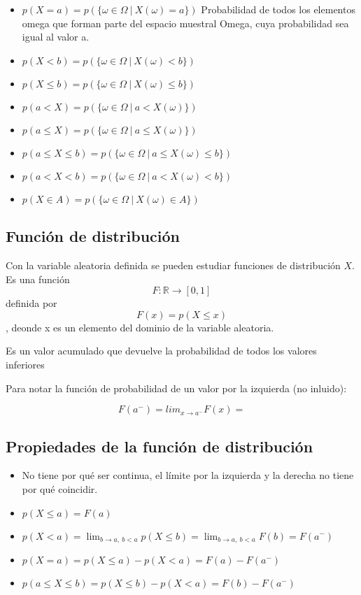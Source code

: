\documentclass[
]{article}
\providecommand{\tightlist}{%
  \setlength{\itemsep}{0pt}\setlength{\parskip}{0pt}}
\begin{document}
\begin{itemize}
\tightlist
\item
  \(p(X=a) = p(\{\omega\in\Omega \ |\  X(\omega) = a\})\) Probabilidad
  de todos los elementos omega que forman parte del espacio muestral
  Omega, cuya probabilidad sea igual al valor a.
\item
  \(p(X<b) = p(\{\omega\in\Omega \ |\  X(\omega) < b\})\)
\item
  \(p(X\le b) = p(\{\omega\in\Omega \ |\  X(\omega) \le b\})\)
\item
  \(p(a<X) = p(\{\omega\in\Omega \ |\  a<X(\omega)\})\)
\item
  \(p(a\le X) = p(\{\omega\in\Omega \ |\  a\le X(\omega)\})\)
\item
  \(p(a\le X\le b) = p(\{\omega\in\Omega \ |\  a\le X(\omega) \le b\})\)
\item
  \(p(a< X< b) = p(\{\omega\in\Omega \ |\  a< X(\omega) < b\})\)
\item
  \(p(X\in A) = p(\{\omega\in\Omega \ |\  X(\omega)\in A\})\)
\end{itemize}

\hypertarget{funciuxf3n-de-distribuciuxf3n}{%
\subsection{Función de
distribución}\label{funciuxf3n-de-distribuciuxf3n}}

Con la variable aleatoria definida se pueden estudiar funciones de
distribución \(X\). Es una función\\
\[F:\mathbb{R}\longrightarrow [0,1]\] definida por \[F(x)=p(X\le x)\],
deonde x es un elemento del dominio de la variable aleatoria.

Es un valor acumulado que devuelve la probabilidad de todos los valores
inferiores

Para notar la función de probabilidad de un valor por la izquierda (no
inluido):

\[ F(a^-) = lim_{x\rightarrow a^-}F(x)= \]

\hypertarget{propiedades-de-la-funciuxf3n-de-distribuciuxf3n}{%
\subsection{Propiedades de la función de
distribución}\label{propiedades-de-la-funciuxf3n-de-distribuciuxf3n}}

\begin{itemize}
\tightlist
\item
  No tiene por qué ser continua, el límite por la izquierda y la derecha
  no tiene por qué coincidir.
\item
  \(p(X\le a)=F(a)\)
\item
  \(p(X<a)=\lim_{b\rightarrow a,\  b<a}p(X\le b) = \lim_{b\rightarrow a,\  b<a} F(b) = F(a^-)\)
\item
  \(p(X=a) = p(X\le a)-p(X<a)=F(a)-F(a^-)\)
\item
  \(p(a\le X\le b) = p(X\le b)-p(X< a)=F(b)-F(a^-)\)
\end{itemize}
\end{document}
